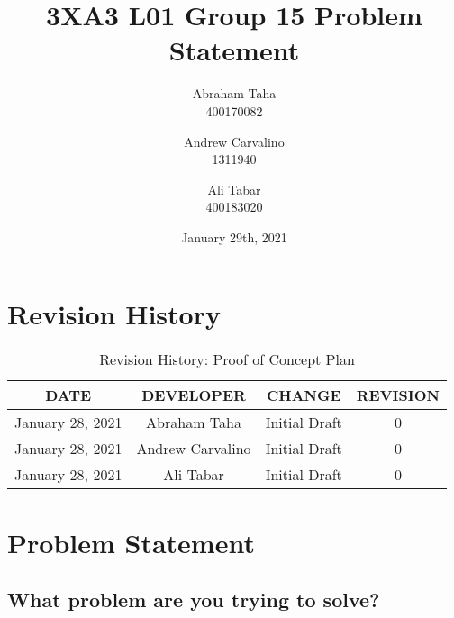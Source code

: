 \documentclass[11pt, oneside]{article}   	%
\title{3XA3 L01 Group 15 Problem Statement
}
\author{Abraham Taha\\
		400170082
		\and
		Andrew Carvalino\\
		1311940
		\and
		Ali Tabar\\
		400183020}
\date{January 29th, 2021}							%
\begin{document}
\maketitle
\newpage
\tableofcontents
\newpage

\section{Revision History}

\begin{table}[hp]
\caption{Revision History: Proof of Concept Plan}
\begin{center}
\label{tab:}
\begin{tabular}{|c|c|c|c|}
\hline
\textbf{DATE} & \textbf{DEVELOPER} & \textbf{CHANGE} & \textbf{REVISION}\\
\hline
January 28, 2021 & Abraham Taha & Initial Draft & 0\\
\hline
January 28, 2021 & Andrew Carvalino & Initial Draft & 0\\
\hline
January 28, 2021 & Ali Tabar & Initial Draft & 0\\
\hline
\end{tabular}
\end{center}
\label{default}
\end{table}


\newpage
\section{Problem Statement}
\subsection{What problem are you trying to solve?}
\end{document}

